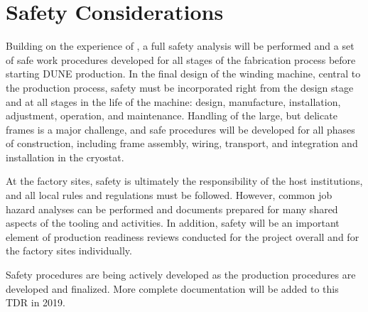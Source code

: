 \section{Safety Considerations}
\label{sec:fdsp-apa-safety}

Building on the experience of , a full safety analysis will be performed and a set of safe work procedures developed for all stages of the fabrication process before starting DUNE  production.  In the final design of the winding machine, central to the production process, safety must be incorporated right from the design stage and at all stages in the life of the machine: design, manufacture, installation, adjustment, operation, and maintenance.  Handling of the large, but delicate frames is a major challenge, and safe procedures will be developed for all phases of construction, including frame assembly, wiring, transport, and integration and installation in the cryostat.         

At the factory sites, safety is ultimately the responsibility of the host institutions, and all local rules and regulations must be followed.  However, common job hazard analyses can be performed and documents prepared for many shared aspects of the tooling and activities.  In addition, safety will be an important element of production readiness reviews conducted for the project overall and for the factory sites individually.   

Safety procedures are being actively developed as the production procedures are developed and finalized.  More complete documentation will be added to this TDR in 2019.  